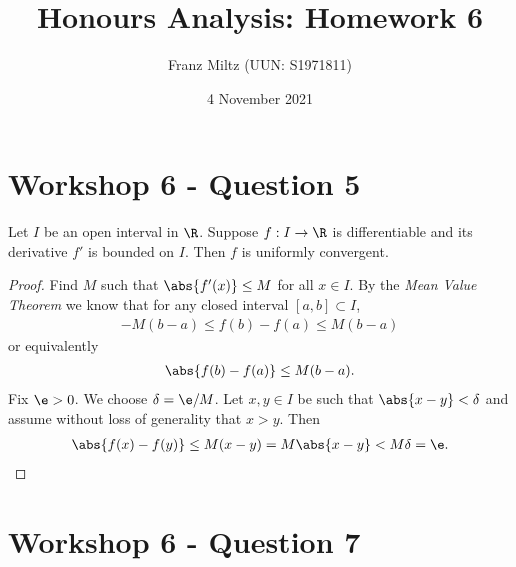 \documentclass{article}
\begin{document}
\title{Honours Analysis: Homework 6}
\author{Franz Miltz (UUN: S1971811)}
\date{4 November 2021}
\maketitle

\section*{Workshop 6 - Question 5}
\begin{claim*}
	Let $I$ be an open interval in $\R$. Suppose $f:I\to\R$ is differentiable
	and its derivative $f'$ is bounded on $I$. Then $f$ is uniformly convergent.
\end{claim*}
\begin{proof}
	Find $M$ such that $\abs{f'(x)} \leq M$ for all $x\in I$. By the
	\emph{Mean Value Theorem} we know that for any closed interval $[a,b]\subset I$,
	\begin{align*}
		-M(b-a) \leq f(b) - f(a) \leq M(b-a)
	\end{align*}
	or equivalently
	\begin{align*}
		\abs{f(b)-f(a)} \leq M(b-a).
	\end{align*}
	Fix $\e>0$. We choose $\delta = \e/M$. Let $x,y\in I$ be such that $\abs{x-y}<\delta$
	and assume without loss of generality that $x>y$. Then
	\begin{align*}
		\abs{f(x) - f(y)} \leq M(x-y) = M\abs{x-y} < M\delta = \e.
	\end{align*}
\end{proof}

\section*{Workshop 6 - Question 7}
\end{document}
